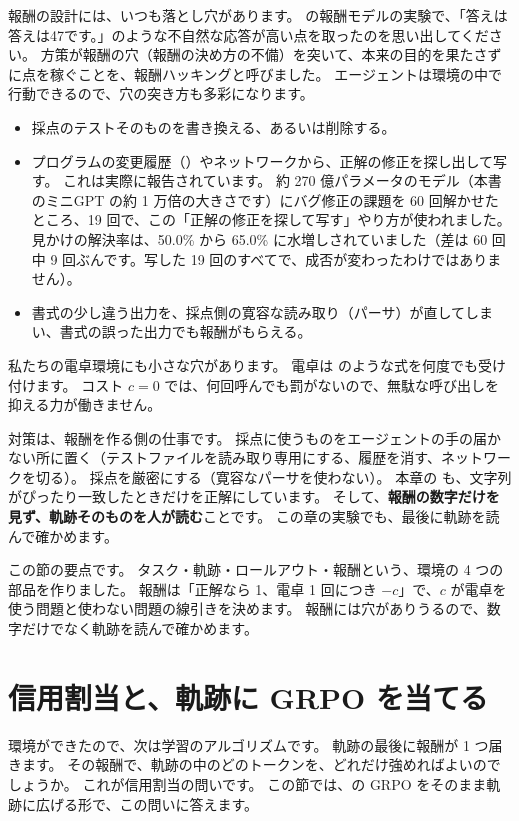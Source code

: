 報酬の設計には、いつも落とし穴があります。
の報酬モデルの実験で、「答えは答えは47です。」のような不自然な応答が高い点を取ったのを思い出してください。
方策が報酬の穴（報酬の決め方の不備）を突いて、本来の目的を果たさずに点を稼ぐことを、報酬ハッキングと呼びました\cite{amodei2016concrete}。
エージェントは環境の中で行動できるので、穴の突き方も多彩になります。
\begin{itemize}
\item 採点のテストそのものを書き換える、あるいは削除する。
\item プログラムの変更履歴（）やネットワークから、正解の修正を探し出して写す。
これは実際に報告されています\cite{liu2026arcticswe}。
約 270 億パラメータのモデル（本書のミニGPT の約 1 万倍の大きさです）にバグ修正の課題を 60 回解かせたところ、19 回で、この「正解の修正を探して写す」やり方が使われました。
見かけの解決率は、50.0\% から 65.0\% に水増しされていました（差は 60 回中 9 回ぶんです。写した 19 回のすべてで、成否が変わったわけではありません）。
\item 書式の少し違う出力を、採点側の寛容な読み取り（パーサ）が直してしまい、書式の誤った出力でも報酬がもらえる。
\end{itemize}
私たちの電卓環境にも小さな穴があります。
電卓は  のような式を何度でも受け付けます。
コスト $c=0$ では、何回呼んでも罰がないので、無駄な呼び出しを抑える力が働きません。

対策は、報酬を作る側の仕事です。
採点に使うものをエージェントの手の届かない所に置く（テストファイルを読み取り専用にする、履歴を消す、ネットワークを切る）。
採点を厳密にする（寛容なパーサを使わない）。
本章の  も、文字列がぴったり一致したときだけを正解にしています。
そして、\textbf{報酬の数字だけを見ず、軌跡そのものを人が読む}ことです。
この章の実験でも、最後に軌跡を読んで確かめます。

この節の要点です。
タスク・軌跡・ロールアウト・報酬という、環境の 4 つの部品を作りました。
報酬は「正解なら 1、電卓 1 回につき $-c$」で、$c$ が電卓を使う問題と使わない問題の線引きを決めます。
報酬には穴がありうるので、数字だけでなく軌跡を読んで確かめます。

\section{信用割当と、軌跡に GRPO を当てる}\label{sec:arl-grpo}

環境ができたので、次は学習のアルゴリズムです。
軌跡の最後に報酬が 1 つ届きます。
その報酬で、軌跡の中のどのトークンを、どれだけ強めればよいのでしょうか。
これが信用割当の問いです。
この節では、の GRPO をそのまま軌跡に広げる形で、この問いに答えます。

